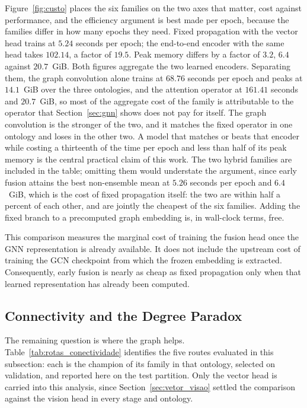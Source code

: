 \documentclass[Ingles]{ic-tese-v3}
\begin{document}
Figure~\ref{fig:custo} places the six families on the two axes that matter, cost against
performance, and the efficiency argument is best made per epoch, because the families differ
in how many epochs they need. Fixed propagation with the vector head trains at $5.24$ seconds
per epoch; the end-to-end encoder with the same head takes $102.14$, a factor of $19.5$. Peak
memory differs by a factor of $3.2$, $6.4$ against $20.7$~GiB. Both figures aggregate the two
learned encoders. Separating them, the graph convolution alone trains at $68.76$ seconds per
epoch and peaks at $14.1$~GiB over the three ontologies, and the attention operator at $161.41$
seconds and $20.7$~GiB, so most of the aggregate cost of the family is attributable to the
operator that Section~\ref{sec:gnn} shows does not pay for itself. The graph convolution is the
stronger of the two, and it matches the fixed operator in one ontology and loses in the other
two. A model that matches or beats that encoder while costing a thirteenth of the time per epoch
and less than half of its peak memory is the central practical claim of this work. The two hybrid families are included in the table; omitting them would understate the
argument, since early fusion attains the best non-ensemble mean at $5.26$ seconds per epoch
and $6.4$~GiB, which is the cost of fixed propagation itself: the two are within half a
percent of each other, and are jointly the cheapest of the six families. Adding the fixed
branch to a precomputed graph embedding is, in wall-clock terms, free. 

This comparison measures the marginal cost of training the fusion head once the GNN representation is already available. It does not include the upstream cost of training the GCN checkpoint from which the frozen embedding is extracted. Consequently, early fusion is nearly as cheap as fixed propagation only when that learned representation has already been computed.

\subsection{Connectivity and the Degree Paradox}
\label{sec:grau}

The remaining question is where the graph helps. Table~\ref{tab:rotas_conectividade}
identifies the five routes evaluated in this subsection: each is the champion of its family
in that ontology, selected on validation, and reported here on the test partition. Only the
vector head is carried into this analysis, since Section~\ref{sec:vetor_visao} settled the
comparison against the vision head in every stage and ontology.
\end{document}
